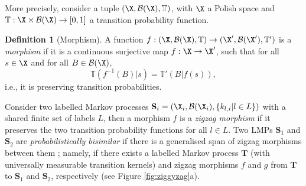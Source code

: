 \documentclass[letterpaper, 10 pt, conference]{amsart}
\theoremstyle{definition}
\newtheorem{defn}[definition]{Definition}
\theoremstyle{example}
\theoremstyle{remark}
\begin{document}
More precisely, 
consider a tuple $(\X,\mathcal{B}(\X),\mathbb T)$, 
with $\X$ a Polish space and $\mathbb T:\X\times \mathcal{B}(\X)\rightarrow [0,1]$ a transition probability function. 
\begin{defn}[Morphism] 
A function $f:(\X,\mathcal{B}(\X),\mathbb T)\rightarrow (\X',\mathcal{B}(\X'),\mathbb T')$ is a \emph{morphism} if it is a continuous surjective map $f:\X \rightarrow \X'$, 
such that for all $s\in \X$ and for all $B\in \mathcal{B}(\X)$,  
\[\mathbb T(f^{-1}(B)|s)=\mathbb T'(B|f(s)),\] 
i.e., it is preserving transition probabilities. 
\end{defn}
Consider two labelled Markov processes  $\mathbf S_i=(\X_i,\mathcal{B}(\X_i),\{k_{l,i}| l\in L\})$ with a shared finite set of labels $L$, 
then a morphism $f$ is a \emph{zigzag morphism} if it preserves the two transition probability functions for all $l\in L$. 
Two LMPs $\mathbf S_1$ and $\mathbf S_2$ are \emph{probabilistically bisimilar} if there is a generalised span of zigzag morphisms between them \cite{Desharnais2002}; 
namely, if there exists a labelled Markov process $\mathbf T$  (with universally measurable transition kernels) and zigzag morphisms $f$ and $g$ from $\mathbf T$ to $\mathbf S_1$ and $\mathbf S_2$, respectively (see Figure \ref{fig:ziggyzag}a).
\end{document}
